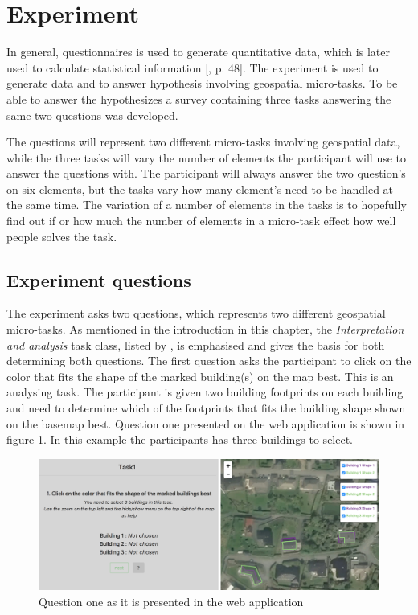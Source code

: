 \section{Experiment}\label{sec:experiment}
In general, questionnaires is used to generate quantitative data, which is later used to calculate statistical information [\citep{Kitchin2000}, p. 48]. The experiment is used to generate data and to answer hypothesis involving geospatial micro-tasks. To be able to answer the hypothesizes a survey containing three tasks answering the same two questions was developed. 

The questions will represent two different micro-tasks involving geospatial data, while the three tasks will vary the number of elements the participant will use to answer the questions with. The participant will always answer the two question's on six elements, but the tasks vary how many element's need to be handled at the same time. The variation of a number of elements in the tasks is to hopefully find out if or how much the number of elements in a micro-task effect how well people solves the task. 

\subsection{Experiment questions}\label{sec:experimentquestions}
The experiment asks two questions, which represents two different geospatial micro-tasks. As mentioned in the introduction in this chapter, the \textit{Interpretation and analysis} task class, listed by \cite{Gadiraju2015}, is emphasised and gives the basis for both determining both questions.  The first question asks the participant to click on the color that fits the shape of the marked building(s) on the map best. This is an analysing task. The participant is given two building footprints on each building and need to determine which of the footprints that fits the building shape shown on the basemap best. Question one presented on the web application is shown in figure \ref{fig:q12}. In this example the participants has three buildings to select. 

\begin{figure}[h]
	\centering
	\includegraphics[width=0.8\linewidth]{fig/q1_2}
	\caption{Question one as it is presented in the web application}
	\label{fig:q12}
\end{figure}

